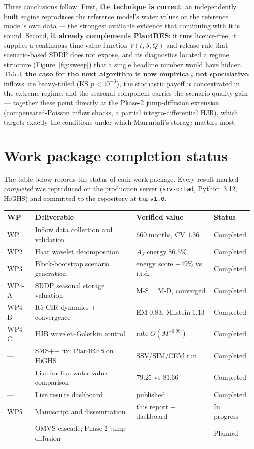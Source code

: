 \documentclass[12pt,a4paper]{article}
\begin{document}
Three conclusions follow. First, \textbf{the technique is correct}: an
independently built engine reproduces the reference model's water values on the
reference model's own data --- the strongest available evidence that
continuing with it is sound. Second, \textbf{it already complements Plan4RES}:
it runs licence-free, it supplies a continuous-time value function
$V(t,S,Q)$ and release rule that scenario-based SDDP does not expose, and its
diagnostics located a regime structure (Figure~\ref{fig:sweep}) that a single
headline number would have hidden. Third, \textbf{the case for the next
algorithm is now empirical, not speculative}: inflows are heavy-tailed
(KS $p<10^{-3}$), the stochastic payoff is concentrated in the extreme regime,
and the seasonal component carries the scenario-quality gain --- together these
point directly at the Phase-2 jump-diffusion extension
(compensated-Poisson inflow shocks, a partial integro-differential HJB), which
targets exactly the conditions under which Manantali's storage matters most.

\section{Work package completion status}

The table below records the status of each work package. Every result marked
\emph{completed} was reproduced on the production server (\texttt{srv-ortad},
Python~3.12, HiGHS) and committed to the repository at tag \texttt{v1.0}.

\begin{center}
\begin{tabular}{p{}p{}p{}l}
\toprule
\textbf{WP} & \textbf{Deliverable} & \textbf{Verified value} & \textbf{Status} \\
\midrule
WP1 & Inflow data collection and validation & 660 months, CV $1.36$ & Completed \\
WP2 & Haar wavelet decomposition & $A_J$ energy $86.5\%$ & Completed \\
WP3 & Block-bootstrap scenario generation & energy score $+49\%$ vs i.i.d. & Completed \\
WP4-A & SDDP seasonal storage valuation & M-S$=$M-D, converged & Completed \\
WP4-B & It\^o CIR dynamics + convergence & EM $0.83$, Milstein $1.13$ & Completed \\
WP4-C & HJB wavelet--Galerkin control & rate $O(M^{-0.99})$ & Completed \\
--- & SMS++ fix: Plan4RES on HiGHS & SSV/SIM/CEM run & Completed \\
--- & Like-for-like water-value comparison & $79.25$ vs $81.66$ & Completed \\
--- & Live results dashboard & published & Completed \\
WP5 & Manuscript and dissemination & this report + dashboard & In progress \\
--- & OMVS cascade; Phase-2 jump diffusion & --- & Planned \\
\bottomrule
\end{tabular}
\end{center}
\end{document}
